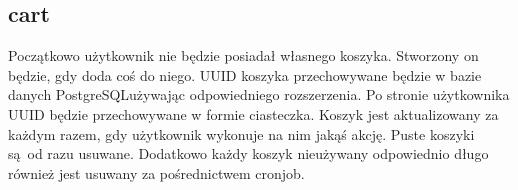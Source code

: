 \subsection*{cart}
Początkowo użytkownik nie będzie posiadał własnego koszyka. Stworzony on będzie, gdy doda coś do niego. UUID koszyka przechowywane będzie w bazie danych PostgreSQLużywając odpowiedniego rozszerzenia. Po stronie użytkownika UUID będzie przechowywane w formie ciasteczka. Koszyk jest aktualizowany za każdym razem, gdy użytkownik wykonuje na nim jakąś akcję. Puste koszyki są od razu usuwane. Dodatkowo każdy koszyk nieużywany odpowiednio długo również jest usuwany za pośrednictwem cronjob.






